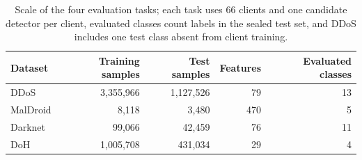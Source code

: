 \begin{table}[t]
    \centering
    \caption{Scale of the four evaluation tasks; each task uses 66 clients and one candidate detector per client, evaluated classes count labels in the sealed test set, and DDoS includes one test class absent from client training.}
    \label{tab:eval-datasets}
    \small
    \begin{tabular}{lrrrr}
        \toprule
        Dataset & Training samples & Test samples & Features & Evaluated classes \\
        \midrule
        DDoS & 3,355,966 & 1,127,526 & 79 & 13 \\
        MalDroid & 8,118 & 3,480 & 470 & 5 \\
        Darknet & 99,066 & 42,459 & 76 & 11 \\
        DoH & 1,005,708 & 431,034 & 29 & 4 \\
        \bottomrule
    \end{tabular}
\end{table}
